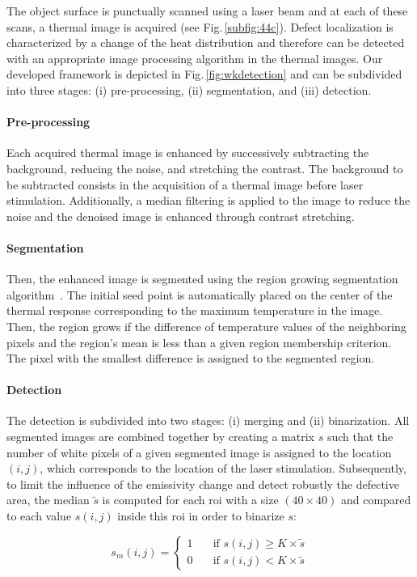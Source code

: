 \documentclass[12pt]{spieman}
\begin{document}
\begin{spacing}{2}
The object surface is punctually scanned using a laser beam and at each of these scans, a thermal image is acquired (see Fig.\,\ref{subfig:44c}).
Defect localization is characterized by a change of the heat distribution and therefore can be detected with an appropriate image processing algorithm in the thermal images.
Our developed framework is depicted in Fig.\,\ref{fig:wkdetection} and can be subdivided into three stages: (i) pre-processing, (ii) segmentation, and (iii) detection.

\paragraph{Pre-processing} Each acquired thermal image is enhanced by successively subtracting the background, reducing the noise, and stretching the contrast. The background to be subtracted consists in the acquisition of a thermal image before laser stimulation. Additionally, a median filtering is applied to the image to reduce the noise and the denoised image is enhanced through contrast stretching.
\paragraph{Segmentation} Then, the enhanced image is segmented using the region growing segmentation algorithm~\cite{Adams1994}. 
The initial seed point is automatically placed on the center of the thermal response corresponding to the maximum temperature in the image.
Then, the region grows if the difference of temperature values of the neighboring pixels and the region's mean is less than a given region membership criterion.
The pixel with the smallest difference is assigned to the segmented region.
\paragraph{Detection} The detection is subdivided into two stages: (i) merging and (ii) binarization.
All segmented images are combined together by creating a matrix $s$ such that the number of white pixels of a given segmented image is assigned to the location $(i,j)$, which corresponds to the location of the laser stimulation.
Subsequently, to limit the influence of the emissivity change and detect robustly the defective area, the median $\tilde{s}$ is computed for each \ac{roi} with a size $(40\times40)$ and compared to each value $s(i,j)$ inside this \ac{roi} in order to binarize $s$:

\begin{equation}
  \label{eq:3}
s_m(i,j) = \begin{cases}
1 & \quad \text{if } s(i,j) \geq K \times \tilde{s}\\
0 & \quad \text{if } s(i,j) < K \times \tilde{s}
\end{cases}
\end{equation}


\end{spacing}
\end{document}
